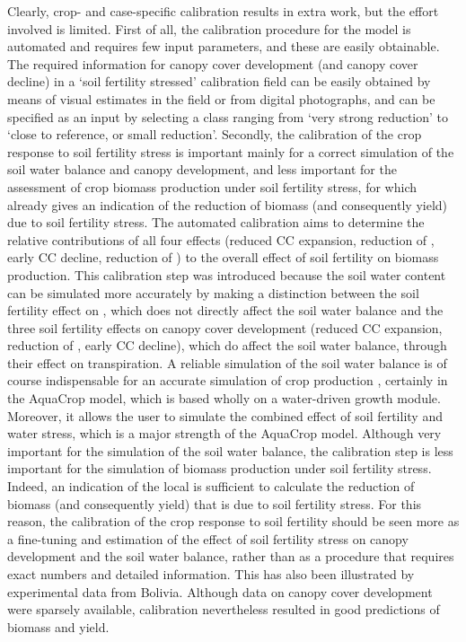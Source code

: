 Clearly, crop- and case-specific calibration results in extra work, but the effort involved is limited. First of all, the calibration procedure for the model is automated and requires few input parameters, and these are easily obtainable. The required information for canopy cover development (\CCx and canopy cover decline) in a `soil fertility stressed' calibration field can be easily obtained by means of visual estimates in the field or from digital photographs, and can be specified as an input by selecting a class ranging from `very strong reduction' to `close to reference, or small reduction'. Secondly, the calibration of the crop response to soil fertility stress is important mainly for a correct simulation of the soil water balance and canopy development, and less important for the assessment of crop biomass production under soil fertility stress, for which \Brel already gives an indication of the reduction of biomass (and consequently yield) due to soil fertility stress. The automated calibration aims to determine the relative contributions of all four effects (reduced CC expansion, reduction of \CCx, early CC decline, reduction of \WPster) to the overall effect of soil fertility on biomass production. This calibration step was introduced because the soil water content can be simulated more accurately by making a distinction between the soil fertility effect on \WPster, which does not directly affect the soil water balance and the three soil fertility effects on canopy cover development (reduced CC expansion, reduction of \CCx, early CC decline), which do affect the soil water balance, through their effect on transpiration. A reliable simulation of the soil water balance is of course indispensable for an accurate simulation of crop production \parencite{aggarwal1995, eitzinger2004}, certainly in the AquaCrop model, which is based wholly on a water-driven growth module. Moreover, it allows the user to simulate the combined effect of soil fertility and water stress, which is a major strength of the AquaCrop model. Although very important for the simulation of the soil water balance, the calibration step is less important for the simulation of biomass production under soil fertility stress. Indeed, an indication of the local \Brel is sufficient to calculate the reduction of biomass (and consequently yield) that is due to soil fertility stress. For this reason, the calibration of the crop response to soil fertility should be seen more as a fine-tuning and estimation of the effect of soil fertility stress on canopy development and the soil water balance, rather than as a procedure that requires exact numbers and detailed information. This has also been illustrated by experimental data from Bolivia. Although data on canopy cover development were sparsely available, calibration nevertheless resulted in good predictions of biomass and yield. 

